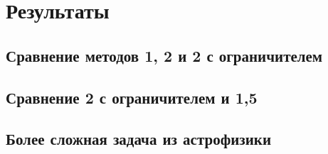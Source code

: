 \chapter{Результаты}

\section{Сравнение методов 1, 2 и 2 с ограничителем}
\section{Сравнение 2 с ограничителем и 1,5}
\section{Более сложная задача из астрофизики}